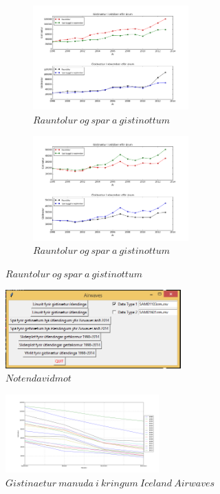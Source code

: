 \documentclass[11pt,a4paper]{amsart}
\theoremstyle{plain}
\theoremstyle{definition}
\theoremstyle{remark}
\begin{document}
\begin{figure}[H]
	\centering
	\begin{subfigure}[b]{0.45\textwidth}
		\includegraphics[height=40mm]{figure_3.png}
		\caption{$ Rauntolur\ og\ spar\ a\ gistinottum $\label{fig:mynd4}}
	\end{subfigure}
	\begin{subfigure}[b]{0.45\textwidth}
		\includegraphics[height=40mm]{figure_2.png}
		\caption{$ Rauntolur\ og\ spar\ a\ gistinottum $\label{fig:gist_spa}}
	\end{subfigure}
\end{figure}

\begin{figure}[H]
\centering
\includegraphics[height=30mm]{GUI.png}
\caption{$ Notendavidmot $\label{fig:noten}}
\end{figure}

\begin{figure}[H]
\centering
\includegraphics[height=30mm]{my_plot.png}
\caption{$ Gistinaetur\ manuda\ i\ kringum\ Iceland\ Airwaves $\label{fig:gist_hlutf}}
\end{figure}
	
{}

\end{document}

